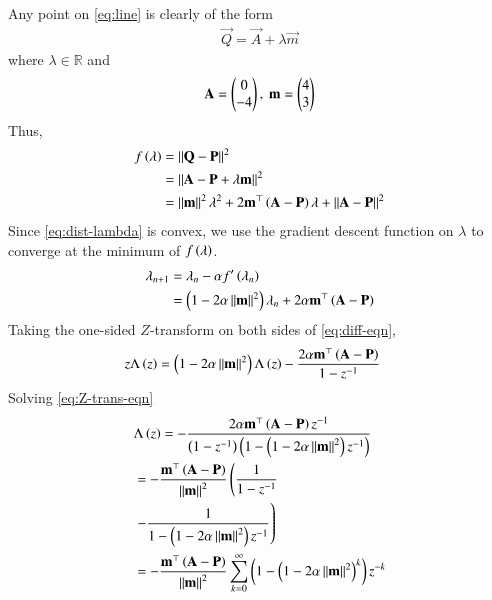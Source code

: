 \documentclass[journal,12pt,twocolumn]{IEEEtran}
\begin{document}
\begin{enumerate}
    \solution Any point on \eqref{eq:line} is clearly of the form
    \begin{align}
        \vec{Q} = \vec{A} + \lambda\vec{m}
        \label{eq:Q-def}
    \end{align}
    where $\lambda \in \mathbb{R}$ and
    \begin{align}
        \mathbf{A} = \begin{pmatrix}0\\-4\end{pmatrix},\ \mathbf{m} = \begin{pmatrix}4\\3\end{pmatrix}
        \label{eq:vals}
    \end{align}
    Thus,
    \begin{align}
        f\left(\lambda\right) &= \left\lVert\mathbf{Q}-\mathbf{P}\right\rVert^2 \\
                        &= \left\lVert\mathbf{A}-\mathbf{P}+\lambda\mathbf{m}\right\rVert^2 \\
                        &= \left\lVert\mathbf{m}\right\rVert^2\lambda^2 + 2\mathbf{m}^\top\left(\mathbf{A}-\mathbf{P}\right)\lambda + \left\lVert\mathbf{A}-\mathbf{P}\right\rVert^2
                        \label{eq:dist-lambda}
    \end{align}
    Since \eqref{eq:dist-lambda} is convex, we use the gradient descent function 
    on $\lambda$ to converge at the minimum of $f\left(\lambda\right)$.
    \begin{align}
        \lambda_{n+1} &= \lambda_n - \alpha f'\left(\lambda_n\right) \\
                      &= \left(1-2\alpha\left\lVert\mathbf{m}\right\rVert^2\right)\lambda_n + 2\alpha\mathbf{m}^\top\left(\mathbf{A}-\mathbf{P}\right)
                      \label{eq:diff-eqn}
    \end{align}
    Taking the one-sided $Z$-transform on both sides of \eqref{eq:diff-eqn},
    \begin{align}
        z\Lambda\left(z\right) &= \left(1-2\alpha\left\lVert\mathbf{m}\right\rVert^2\right)\Lambda\left(z\right) - \frac{2\alpha\mathbf{m}^\top\left(\mathbf{A}-\mathbf{P}\right)}{1-z^{-1}}
        \label{eq:Z-trans-eqn}
    \end{align}
    Solving \eqref{eq:Z-trans-eqn}
    \begin{align}
        &\Lambda\brak{z} = -\frac{2\alpha\vec{m}^\top\brak{\vec{A}-\vec{P}}z^{-1}}{\brak{1- z^{-1}}\brak{1 - \brak{1-2\alpha\norm{\vec{m}}^2}z^{-1}}} \label{eq:roc} \\
        &= -\frac{\vec{m}^\top\brak{\vec{A}-\vec{P}}}{\norm{\vec{m}}^2}\lbrak{\frac{1}{1-z^{-1}}} \\
        &\rbrak{- \frac{1}{1-\brak{1-2\alpha\norm{\vec{m}}^2}z^{-1}}} \\
        &= -\frac{\vec{m}^\top\brak{\vec{A}-\vec{P}}}{\norm{\vec{m}}^2}\sum_{k=0}^{\infty}\brak{1-\brak{1-2\alpha\norm{\vec{m}}^2}^k}z^{-k}

\end{align}
\end{enumerate}
\end{document}
